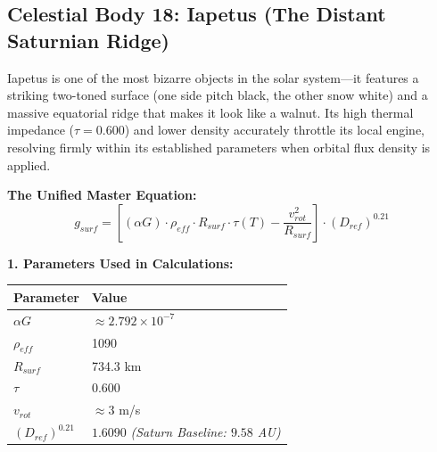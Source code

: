 \documentclass[11pt, a4paper]{article}
\begin{document}
\clearpage
\subsection{Celestial Body 18: Iapetus (The Distant Saturnian Ridge)}
  Iapetus is one of the most bizarre objects in the solar system—it features a striking two-toned surface (one side pitch black, the other snow white) and a massive equatorial ridge that makes it look like a walnut. Its high thermal impedance ($\tau = 0.600$) and lower density accurately throttle its local engine, resolving firmly within its established parameters when orbital flux density is applied.

  \vspace{0.5em}
  \noindent \textbf{The Unified Master Equation:}
  $$ g_{surf} = \left[ (\alpha G) \cdot \rho_{eff} \cdot R_{surf} \cdot \tau(T) - \frac{v_{rot}^2}{R_{surf}} \right] \cdot (D_{ref})^{0.21} $$

  \vspace{0.5em}
  \noindent \textbf{1. Parameters Used in Calculations:} \\[0.5em]
  \begingroup
  \renewcommand{\arraystretch}{1.3}
  \hspace*{2em}
  \begin{tabular}{|l|l|}
    \hline
    \textbf{Parameter} & \textbf{Value} \\ \hline
    $\alpha G$ & $\approx 2.792 \times 10^{-7}$ \\ \hline
    $\rho_{eff}$ & 1090 \\ \hline
    $R_{surf}$ & 734.3 km \\ \hline
    $\tau$ & 0.600 \\ \hline
    $v_{rot}$ & $\approx 3$ m/s \\ \hline
    $(D_{ref})^{0.21}$ & $1.6090$ \textit{(Saturn Baseline: $9.58$ AU)} \\ \hline
  \end{tabular}
  \endgroup
\end{document}
